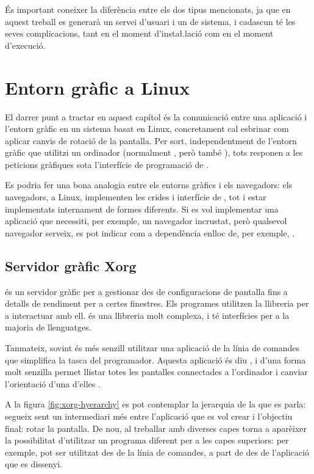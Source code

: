És important coneixer la diferència entre els dos tipus mencionats, ja que en
aquest treball es generarà un servei d'usuari i un de sistema, i cadascun té
les seves complicacions, tant en el moment d'insta\l.lació com en el moment
d'execució.

\section{Entorn gràfic a Linux}

El darrer punt a tractar en aquest capítol és la comunicació entre una
aplicació i l'entorn gràfic en un sistema basat en Linux, concretament cal
esbrinar com aplicar canvis de rotació de la pantalla. Per sort, 
independentment de l'entorn gràfic que utilitzi un ordinador (normalment
, però també ), tots responen a les peticions gràfiques
sota l'interfície de programació de  \cite{Xlib}.

Es podria fer una bona analogia entre
els entorns gràfics i els navegadors: els navegadors, a Linux, implementen les
crides i interfície de , tot i estar implementats internament
de formes diferents. Si es vol implementar una aplicació que necessiti, per
exemple, un navegador incrustat, però qualsevol navegador serveix, es pot
indicar com a dependència  enlloc de, per exemple, .

\subsection{Servidor gràfic Xorg}

 és un servidor gràfic per a gestionar des de configuracions de
pantalla fins a detalls de rendiment per a certes finestres. Els programes
utilitzen la llibreria  per a interactuar amb ell.
 és una llibreria molt complexa, i té interfícies per a la majoria
de llenguatges.

Tanmateix, sovint és més senzill utilitzar una aplicació de
la línia de comandes que simplifica la tasca del programador. Aquesta
aplicació és diu , i d'una forma molt senzilla permet llistar
totes les pantalles connectades a l'ordinador i canviar l'orientació
d'una d'elles \cite{Xrandr}.

A la figura \ref{fig:xorg-hyerarchy} es pot contemplar la jerarquia de la que
es parla:  segueix sent un intermediari més entre l'aplicació que
es vol crear i l'objectiu final: rotar la pantalla. De nou, al treballar amb
diverses capes torna a aparèixer la possibilitat d'utilitzar un programa
diferent per a les capes superiors: per exemple,  pot ser utilitzat
des de la línia de comandes, a part de des de l'aplicació que es dissenyi.

